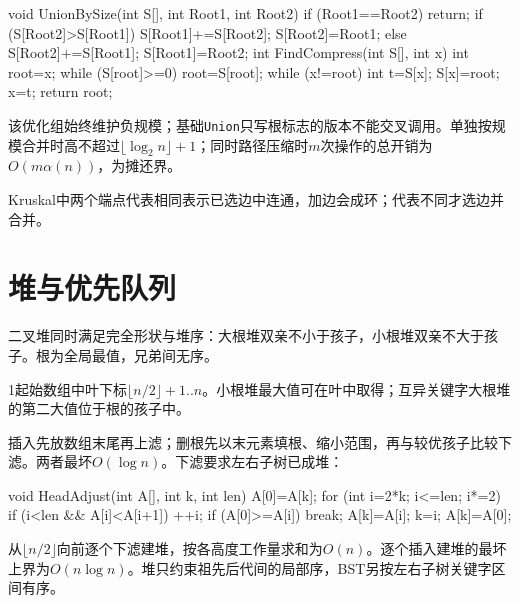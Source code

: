 \par\smallskip\noindent\begin{minipage}{\linewidth}
\begin{codeblock}[language={C++}]
void UnionBySize(int S[], int Root1, int Root2) {
    if (Root1==Root2) return;
    if (S[Root2]>S[Root1]) {
        S[Root1]+=S[Root2];
        S[Root2]=Root1;
    } else {
        S[Root2]+=S[Root1];
        S[Root1]=Root2;
    }
}
int FindCompress(int S[], int x) {
    int root=x;
    while (S[root]>=0) root=S[root];
    while (x!=root) {
        int t=S[x];
        S[x]=root;
        x=t;
    }
    return root;
}
\end{codeblock}
\end{minipage}\par\smallskip

该优化组始终维护负规模；基础\texttt{Union}只写根标志的版本不能交叉调用。单独按规模合并时高不超过\(\lfloor\log_2n\rfloor+1\)；同时路径压缩时\(m\)次操作的总开销为\(O(m\alpha(n))\)，为摊还界。

Kruskal中两个端点代表相同表示已选边中连通，加边会成环；代表不同才选边并合并。

\section{堆与优先队列}\label{DS05-heap}

二叉堆同时满足完全形状与堆序：大根堆双亲不小于孩子，小根堆双亲不大于孩子。根为全局最值，兄弟间无序。

1起始数组中叶下标\(\lfloor n/2\rfloor+1..n\)。小根堆最大值可在叶中取得；互异关键字大根堆的第二大值位于根的孩子中。

插入先放数组末尾再上滤；删根先以末元素填根、缩小范围，再与较优孩子比较下滤。两者最坏\(O(\log n)\)。下滤要求左右子树已成堆：

\par\smallskip\noindent\begin{minipage}{\linewidth}
\begin{codeblock}[language={C++}]
void HeadAdjust(int A[], int k, int len) {
    A[0]=A[k];
    for (int i=2*k; i<=len; i*=2) {
        if (i<len && A[i]<A[i+1]) ++i;
        if (A[0]>=A[i]) break;
        A[k]=A[i]; k=i;
    }
    A[k]=A[0];
}
\end{codeblock}
\end{minipage}\par\smallskip

从\(\lfloor n/2\rfloor\)向前逐个下滤建堆，按各高度工作量求和为\(O(n)\)。逐个插入建堆的最坏上界为\(O(n\log n)\)。堆只约束祖先后代间的局部序，BST另按左右子树关键字区间有序。
